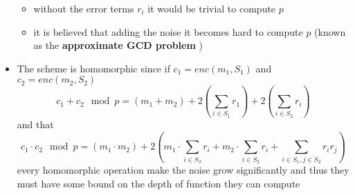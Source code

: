 \begin{itemize}
    \begin{itemize}
        \item without the error terms $r_i$ it would be trivial to compute $p$
        \item it is believed that adding the noise it becomes hard to compute $p$ (known as the \textbf{approximate GCD problem} )
    \end{itemize}
    \item The scheme is homomorphic since if $c_1 = enc(m_1, S_1)$ and $c_2 = enc(m_2, S_2)$
    \begin{equation*}
        c_1 + c_2 \mod p = (m_1 + m_2) + 2\left(\sum_{i \in S_1}r_1\right) + 2\left(\sum_{i \in S_2}r_i \right)
    \end{equation*}
    and that 
    \begin{equation*}
        c_1 \cdot c_2 \mod p = (m_1 \cdot m_2) + 2 \left(m_1 \cdot \sum_{i\in S_2}r_i + m_2 \cdot \sum_{i\in S_2}r_i + \sum_{i\in S_1, j\in S_2}r_ir_j \right)
    \end{equation*}
    every homomorphic operation make the noise grow significantly and thus they must have some bound on the depth of function they can compute


\end{itemize}
